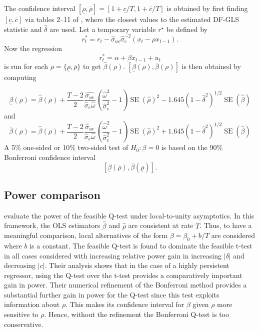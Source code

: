 \documentclass[11pt, a4paper]{article}
\begin{document}
The confidence interval $[\underline{\rho}, \overline{\rho}]=[1+\underline{c} / T, 1+\overline{c} / T]$ is obtained by first finding $[\underline{c}, \overline{c}]$ via tables 2–11 of \citet{campbell2005implementing}, where the closest values to the estimated DF-GLS statistic and $\hat{\delta}$ are used. Let a temporary variable $r^{\star}$ be defined by
\begin{equation}
r_{t}^{*}=r_{t}-\widehat{\sigma}_{u e} \widehat{\sigma}_{e}^{-2}\left(x_{t}-\rho x_{t-1}\right).
\end{equation}
Now the regression
\begin{equation}
r_{t}^{*}=\alpha+\beta x_{t-1}+u_{t}
\end{equation} 
is run for each $\rho=\{\underline{\rho}, \overline{\rho}\}$ to get $\widehat{\beta}(\rho)$. $[\underline{\beta}(\rho), \overline{\beta}(\rho)]$ is then obtained by computing

\begin{equation}
\underline{\beta}(\rho)=\widehat{\beta}(\rho)+\frac{T-2}{2} \frac{\widehat{\sigma_{ue}}}{\widehat{\sigma}_{e} \widehat{\omega}}\left(\frac{\widehat{\omega}^{2}}{\widehat{\sigma}_{v}^{2}}-1\right) \operatorname{SE}(\widehat{\rho})^{2}-1.645\left(1-\widehat{\delta}^{2}\right)^{1 / 2} \operatorname{SE}(\widehat{\beta})
\end{equation}
and 
\begin{equation}
\overline{\beta}(\rho)=\widehat{\beta}(\rho)+\frac{T-2}{2} \frac{\widehat{\sigma}_{u e}}{\widehat{\sigma}_{e} \widehat{\omega}}\left(\frac{\widehat{\omega}^{2}}{\widehat{\sigma}_{v}^{2}}-1\right) \operatorname{SE}(\widehat{\rho})^{2}+1.645\left(1-\widehat{\delta}^{2}\right)^{1 / 2} \operatorname{SE}(\widehat{\beta})
\end{equation}
A 5\% one-sided or 10\% two-sided test of $H_0: \beta = 0$ is based on the 90\% Bonferroni confidence interval
$$[\underline{\beta}(\overline{\rho}), \overline{\beta}(\underline{\rho})].$$
\subsection{Power comparison}
\label{power}
\citet{campbell2006efficient} evaluate the power of the feasible Q-test under local-to-unity asymptotics. In this framework, the OLS estimators $\hat{\beta}$ and $\hat{\rho}$ are consistent at rate $T$. Thus, to have a meaningful comparison, local alternatives of the form $\beta = \beta_0 + b/T$ are considered where $b$ is a constant. The feasible Q-test is found to dominate the feasible t-test in all cases considered with increasing relative power gain in increasing $|\delta|$ and decreasing $|c|$. Their analysis shows that in the case of a highly persistent regressor, using the Q-test over the t-test provides a comparatively important gain in power. Their numerical refinement of the Bonferroni method provides a substantial further gain in power for the Q-test since this test exploits information about $\rho$. This makes its confidence interval for $\beta$ given $\rho$ more sensitive to $\rho$. Hence, without the refinement the Bonferroni Q-test is too conservative.
\end{document}

